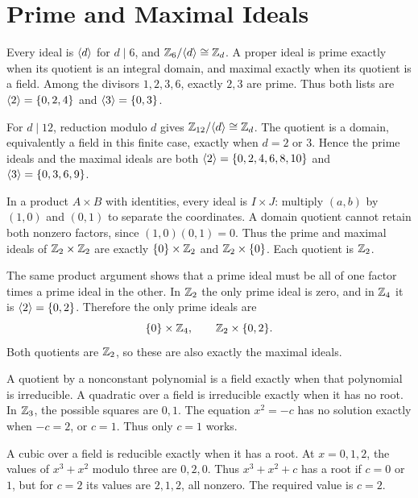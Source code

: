 \section{Prime and Maximal Ideals}

Every ideal is $\langle d\rangle$ for $d\mid6$, and $\mathbb{Z}_6/\langle d\rangle\cong\mathbb{Z}_d$. A proper ideal is prime exactly when its quotient is an integral domain, and maximal exactly when its quotient is a field. Among the divisors $1,2,3,6$, exactly $2,3$ are prime. Thus both lists are $\langle 2\rangle=\{0,2,4\}$ and $\langle 3\rangle=\{0,3\}$.

For $d\mid12$, reduction modulo $d$ gives $\mathbb{Z}_{12}/\langle d\rangle\cong\mathbb{Z}_d$. The quotient is a domain, equivalently a field in this finite case, exactly when $d=2$ or $3$. Hence the prime ideals and the maximal ideals are both $\langle 2\rangle=\{0,2,4,6,8,10\}$ and $\langle 3\rangle=\{0,3,6,9\}$.

In a product $A\times B$ with identities, every ideal is $I\times J$: multiply $(a,b)$ by $(1,0)$ and $(0,1)$ to separate the coordinates. A domain quotient cannot retain both nonzero factors, since $(1,0)(0,1)=0$. Thus the prime and maximal ideals of $\mathbb{Z}_2\times\mathbb{Z}_2$ are exactly $\{0\}\times\mathbb{Z}_2$ and $\mathbb{Z}_2\times\{0\}$. Each quotient is $\mathbb{Z}_2$.

The same product argument shows that a prime ideal must be all of one factor times a prime ideal in the other. In $\mathbb{Z}_2$ the only prime ideal is zero, and in $\mathbb{Z}_4$ it is $\langle 2\rangle=\{0,2\}$. Therefore the only prime ideals are
\[\{0\}\times\mathbb{Z}_4,\qquad\mathbb{Z}_2\times\{0,2\}.\]
Both quotients are $\mathbb{Z}_2$, so these are also exactly the maximal ideals.

A quotient by a nonconstant polynomial is a field exactly when that polynomial is irreducible. A quadratic over a field is irreducible exactly when it has no root. In $\mathbb{Z}_3$, the possible squares are $0,1$. The equation $x^2=-c$ has no solution exactly when $-c=2$, or $c=1$. Thus only $c=1$ works.

A cubic over a field is reducible exactly when it has a root. At $x=0,1,2$, the values of $x^3+x^2$ modulo three are $0,2,0$. Thus $x^3+x^2+c$ has a root if $c=0$ or $1$, but for $c=2$ its values are $2,1,2$, all nonzero. The required value is $c=2$.


